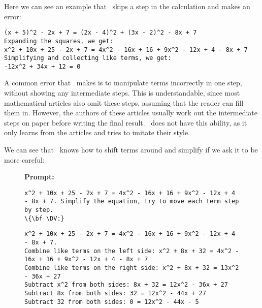 Here we can see an example that \DV \ skips a step in the calculation and makes an error:

\begin{AIbox}{\DV}
\begin{verbatim}
(x + 5)^2 - 2x + 7 = (2x - 4)^2 + (3x - 2)^2 - 8x + 7
Expanding the squares, we get:
x^2 + 10x + 25 - 2x + 7 = 4x^2 - 16x + 16 + 9x^2 - 12x + 4 - 8x + 7
Simplifying and collecting like terms, we get:
-12x^2 + 34x + 12 = 0
\end{verbatim}
\end{AIbox}


A common error that \DV \ makes is to manipulate terms incorrectly in one step, without showing any intermediate steps. This is understandable, since most mathematical articles also omit these steps, assuming that the reader can fill them in. However, the authors of these articles usually work out the intermediate steps on paper before writing the final result. \DV \ does not have this ability, as it only learns from the articles and tries to imitate their style.

We can see that \DV \ knows how to shift terms around and simplify if we ask it to be more careful:
\begin{figure}[H]
\begin{AIbox}{\DV}
{\bf Prompt:}
\begin{verbatim}
x^2 + 10x + 25 - 2x + 7 = 4x^2 - 16x + 16 + 9x^2 - 12x + 4 - 8x + 7. Simplify the equation, try to move each term step by step. 
\{\bf \DV:}
\end{verbatim} 
\begin{verbatim}
x^2 + 10x + 25 - 2x + 7 = 4x^2 - 16x + 16 + 9x^2 - 12x + 4 - 8x + 7.
Combine like terms on the left side: x^2 + 8x + 32 = 4x^2 - 16x + 16 + 9x^2 - 12x + 4 - 8x + 7
Combine like terms on the right side: x^2 + 8x + 32 = 13x^2 - 36x + 27
Subtract x^2 from both sides: 8x + 32 = 12x^2 - 36x + 27
Subtract 8x from both sides: 32 = 12x^2 - 44x + 27
Subtract 32 from both sides: 0 = 12x^2 - 44x - 5
\end{verbatim}
\end{AIbox}
\end{figure}

